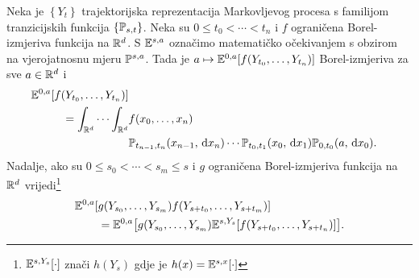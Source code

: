 \documentclass[main.tex]{subfiles}
\begin{document}
\begin{propozicija}
	Neka je \( \left\{ Y_t \right\} \) trajektorijska reprezentacija Markovljevog procesa s
	familijom tranzicijskih funkcija \( \left\{ \Ptrans_{s, t}  \right\} \). Neka su
	\( 0 \le t_0 < \cdots < t_n \) i \( f \) ograničena Borel-izmjeriva funkcija na \( \R^d \).
	S \( \E^{s,a} \) označimo matematičko očekivanjem s obzirom na vjerojatnosnu mjeru
	\( \P^{s,a} \). Tada je \( a \mapsto \E^{0,a}[f(Y_{t_0},\ldots,Y_{t_n})] \) Borel-izmjeriva za sve \( a \in \R^d \) i
	\begin{equation} \label{markov-prop1}
		\begin{aligned}
			\E^{0,a}[f(Y_{t_0},\ldots,Y_{t_n})]                                               \\
			= \int_{\R^d} \cdots \int_{\R^d} & f(x_0,\ldots,x_n)                              \\
			                                 & \Ptrans_{t_{n-1}, t_n}(x_{n-1}, \D x_n) \cdots
			\Ptrans_{t_0, t_1}(x_0, \D x_1) \Ptrans_{0, t_0}(a, \D x_0).
		\end{aligned}
	\end{equation}
	Nadalje, ako su \( 0 \le s_0 < \cdots < s_m \le s \) i \( g \) ograničena Borel-izmjeriva
	funkcija na \( \R^d \) vrijedi\footnote{\( \E^{s,Y_s}[\cdot] \) znači \( h(Y_s) \) gdje
		je \( h(x) = \E^{s,x}[\cdot] \)}
	\begin{equation} \label{markov-svojstvo}
		\begin{aligned}
			\E^{0,a}[ & g(Y_{s_0},\ldots,Y_{s_m}) f(Y_{s+t_0},\ldots,Y_{s+t_m})]                                   \\
			          & =\E^{0,a}\bigl[g(Y_{s_0},\ldots,Y_{s_m}) \E^{s, Y_s}[f(Y_{s+t_0},\ldots,Y_{s+t_n})]\bigr].
		\end{aligned}
	\end{equation}
\end{propozicija}

\begin{komentar} \label{markov-prop-kom}

\end{komentar}
\end{document}
